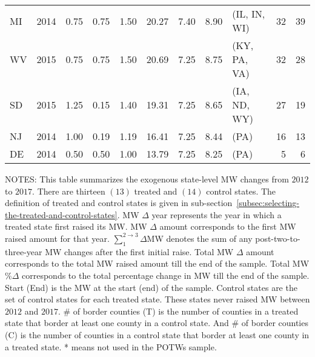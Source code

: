 \begin{table}[H]
{\begin{tabular}{lrrrrrrrlrr}
            MI             & 2014             & 0.75               & 0.75                    & 1.50                     & 20.27               & 7.40     & 8.90   & (IL, IN, WI)   & 32               & 39               \\
            WV             & 2015             & 0.75               & 0.75                    & 1.50                     & 20.69               & 7.25     & 8.75   & (KY, PA, VA)   & 32               & 28               \\
            SD             & 2015             & 1.25               & 0.15                    & 1.40                     & 19.31               & 7.25     & 8.65   & (IA, ND, WY)   & 27               & 19               \\
            NJ             & 2014             & 1.00               & 0.19                    & 1.19                     & 16.41               & 7.25     & 8.44   & (PA)           & 16               & 13               \\
            DE             & 2014             & 0.50               & 0.50                    & 1.00                     & 13.79               & 7.25     & 8.25   & (PA)           & 5                & 6                \\\bottomrule\bottomrule
        \end{tabular}
    }
    \begin{minipage}{17.5cm}
        \vspace{0.01in}
        \tiny NOTES: This table summarizes the exogenous state-level MW changes from $2012$ to $2017$. There are thirteen $(13)$ treated and $(14)$ control states. The definition of treated and control states is given in sub-section~\ref{subsec:selecting-the-treated-and-control-states}. MW $\Delta$ year represents the year in which a treated state first raised its MW. MW $\Delta$ amount corresponds to the first MW raised amount for that year. $\sum_{1}^{2 \rightarrow 3}\Delta$MW denotes the sum of any post-two-to-three-year MW changes after the first initial raise. Total MW $\Delta$ amount corresponds to the total MW raised amount till the end of the sample. Total MW $\%\Delta$ corresponds to the total percentage change in MW till the end of the sample. Start (End) is the MW at the start (end) of the sample. Control states are the set of control states for each treated state. These states never raised MW between $2012$ and $2017$. \# of border counties (T) is the number of counties in a treated state that border at least one county in a control state. And \# of border counties (C) is the number of counties in a control state that border at least one county in a treated state. * means not used in the POTWs sample.
    \end{minipage}
\end{table}